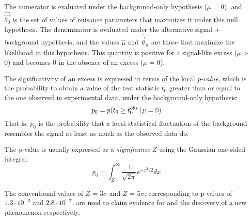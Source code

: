 The numerator is evaluated under the background-only hypothesis ($\mu$ = 0), and $\widehat{\vec{\theta_0}}$ is the set of values of nuisance parameters that maximizes it under this null hypothesis.
The denominator is evaluated under the alternative signal + background hypothesis,
and the values $\hat{\mu}$ and $\widehat{\vec{\theta}}_{\hat\mu}$
are those that maximize the likelihood in this hypothesis.
This quantity is positive for a signal-like excess ($\mu$ > 0) and becomes 0 in the absence of an excess ($\mu$ = 0).

The significativity of an excess is expressed in terms of the local \textit{p-value}, which is the probability to obtain a value of the test statistic $t_0$ greater than or equal to the one observed in experimental data, under the background-only hypothesis:
\begin{equation}
  \label{eq:pvalue}
  p_0 = p(t_0 \ge t_0^{obs}\, |\, \mu = 0)
\end{equation}
That is, $p_0$ is the probability that a local statistical fluctuation of the background resembles the signal at least as much as the observed data do.

The p-value is usually expressed as a \textit{significance} $Z$ using the Gaussian one-sided integral:
\begin{equation}
  \label{eq:significance}
  p_0 = \int_Z^\infty \frac{1}{\sqrt{2\pi}}e^{-x^2/2}dx
\end{equation}

The conventional values of $Z$ = 3$\sigma$ and $Z$ = 5$\sigma$, corresponding to p-values of $1.3 \cdot 10^{-3}$ and $2.8 \cdot 10^{-7}$, are used to claim evidence for and the discovery of a new phenomenon respectively.
